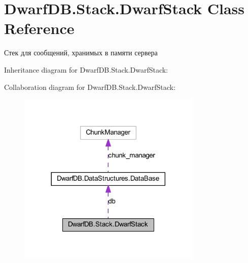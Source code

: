 \hypertarget{class_dwarf_d_b_1_1_stack_1_1_dwarf_stack}{\section{Dwarf\+D\+B.\+Stack.\+Dwarf\+Stack Class Reference}
\label{class_dwarf_d_b_1_1_stack_1_1_dwarf_stack}
}


Стек для сообщений, хранимых в памяти сервера  




Inheritance diagram for Dwarf\+D\+B.\+Stack.\+Dwarf\+Stack\+:


Collaboration diagram for Dwarf\+D\+B.\+Stack.\+Dwarf\+Stack\+:
\nopagebreak
\begin{figure}[H]
\begin{center}
\leavevmode
\includegraphics[width=248pt]{class_dwarf_d_b_1_1_stack_1_1_dwarf_stack__coll__graph}
\end{center}
\end{figure}
